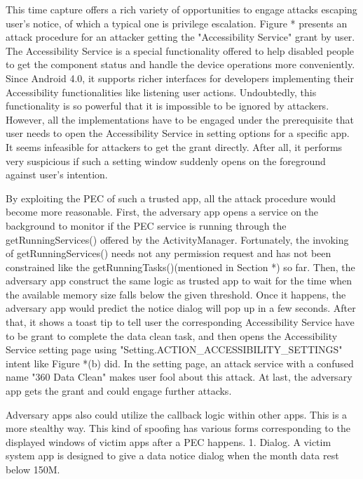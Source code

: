 \documentclass{sig-alternate-05-2015}
\begin{document}
This time capture offers a rich variety of opportunities to engage attacks escaping user's notice, of which a typical one is privilege escalation. Figure * presents an attack procedure for an attacker getting the "Accessibility Service" grant by user. The Accessibility Service is a special functionality offered to help disabled people to get the component status and handle the device operations more conveniently. Since Android 4.0, it supports richer interfaces for developers implementing their Accessibility functionalities like listening user actions. Undoubtedly, this functionality is so powerful that it is impossible to be ignored by attackers. However, all the implementations have to be engaged under the prerequisite that user needs to open the Accessibility Service in setting options for a specific app. It seems infeasible for attackers to get the grant directly. After all, it performs very suspicious if such a setting window suddenly opens on the foreground against user's intention.

By exploiting the PEC of such a trusted app, all the attack procedure would become more reasonable. First, the adversary app opens a service on the background to monitor if the PEC service is running through the getRunningServices() offered by the ActivityManager. Fortunately, the invoking of getRunningServices() needs not any permission request and has not been constrained like the getRunningTasks()(mentioned in Section *) so far. Then, the adversary app construct the same logic as trusted app to wait for the time when the available memory size falls below the given threshold. Once it happens, the adversary app would predict the notice dialog will pop up in a few seconds. After that, it shows a toast tip to tell user the corresponding Accessibility Service have to be grant to complete the data clean task, and then opens the Accessibility Service setting page using "Setting.ACTION\_ACCESSIBILITY\_SETTINGS" intent like Figure *(b) did. In the setting page, an attack service with a confused name "360 Data Clean" makes user fool about this attack. At last, the adversary app gets the grant and could engage further attacks. 

 

Adversary apps also could utilize the callback logic within other apps. This is a more stealthy way. This kind of spoofing has various forms corresponding to the displayed windows of victim apps after a PEC happens.
1. Dialog. A victim system app is designed to give a data notice dialog when the month data rest below 150M. 
\end{document}
